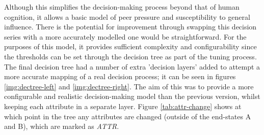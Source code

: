 \documentclass[]{report}
\begin{document}
Although this simplifies the decision-making process beyond that of human cognition, it allows a basic model of peer pressure and susceptibility to general influence. There is the potential for improvement through swapping this decision series with a more accurately modelled one would be straightforward. For the purposes of this model, it provides sufficient complexity and configurability since the thresholds can be set through the decision tree as part of the tuning process.
The final decision tree had a number of extra 'decision layers' added to attempt a more accurate mapping of a real decision process; it can be seen in figures \ref{img:dectree-left} and \ref{img:dectree-right}. The aim of this was to provide a more configurable and realistic decision-making model than the previous version, whilst keeping each attribute in a separate layer. Figure \ref{tab:attr-change} shows at which point in the tree any attributes are changed (outside of the end-states A and B), which are marked as \emph{ATTR}.
\end{document}

